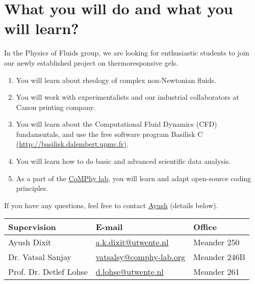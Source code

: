 \documentclass[a4paper,10pt]{article}
\begin{document}
\section*{What you will do and what you will learn?}
In the Physics of Fluids group, we are looking for enthusiastic students to join our newly established project on thermoresponsive gels. 
\begin{enumerate}
	\item You will learn about rheology of complex non-Newtonian fluids. 
	\item You will work with experimentalists and our industrial collaborators at Canon printing company.
	\item You will learn about the Computational Fluid Dynamics (CFD) fundamentals, and use the free software program Basilisk C \href{http://basilisk.dalembert.upmc.fr}{(http://basilisk.dalembert.upmc.fr)}. 
	\item You will learn how to do basic and advanced scientific data analysis. 
	\item As a part of the \href{https://comphy-lab.org}{CoMPhy lab}, you will learn and adapt open-source coding principles. 
\end{enumerate}

If you have any questions, feel free to contact \href{mailto:a.k.dixit@utwente.nl}{Ayush} (details below).
\begin{center}
\begin{tabular}{|l|l|l|}
\hline \textbf{Supervision} & \textbf{E-mail} & \textbf{Office} \\
\hline Ayush Dixit & \href{mailto:a.k.dixit@utwente.nl}{a.k.dixit@utwente.nl} & Meander 250 \\
\hline Dr. Vatsal Sanjay & \href{mailto:vatsalsy@comphy-lab.org}{vatsalsy@comphy-lab.org} & Meander 246B \\
\hline Prof. Dr. Detlef Lohse & \href{mailto:d.lohse@utwente.nl}{d.lohse@utwente.nl} & Meander 261  \\
\hline
\end{tabular}
\end{center}
\end{document}
